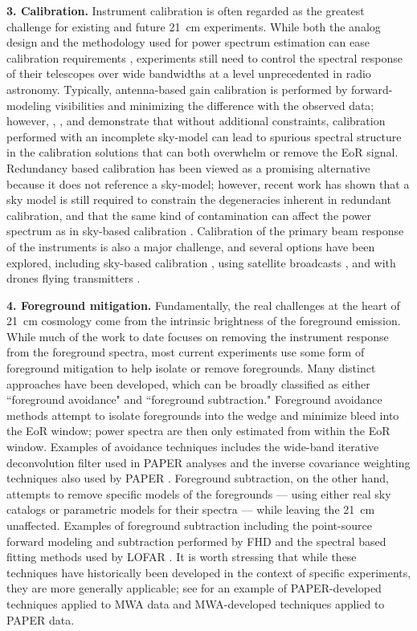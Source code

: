 \textbf{3. Calibration.} Instrument calibration is often regarded as the greatest challenge for existing and future 21~cm experiments.  While both the analog design and the methodology used for power spectrum estimation can ease calibration requirements \cite{morales19}, experiments still need to control the spectral response of their telescopes over wide bandwidths at a level unprecedented in radio astronomy.  Typically, antenna-based gain calibration is performed by forward-modeling visibilities and minimizing the difference with the observed data; however, \cite{barry16}, \cite{patil16}, and \cite{trottwayth2016} demonstrate that without additional constraints, calibration performed with an incomplete sky-model can lead to spurious spectral structure in the calibration solutions that can both overwhelm or remove the EoR signal.  Redundancy based calibration has been viewed as a promising alternative because it does not reference a sky-model; however, recent work has shown that a sky model is still required to constrain the degeneracies inherent in redundant calibration, and that the same kind of contamination can affect the power spectrum as in sky-based calibration \cite{byrne19,li18_redundant,joseph18}. Calibration of the primary beam response of the instruments is also a major challenge, and several options have been explored, including sky-based calibration \cite{pober12}, using satellite broadcasts \cite{neben15,neben16,line18}, and with drones flying transmitters \cite{jacobs17}.

\textbf{4. Foreground mitigation.} Fundamentally, the real challenges at the heart of 21~cm cosmology come from the intrinsic brightness of the foreground emission.  While much of the work to date focuses on removing the instrument response from the foreground spectra, most current experiments use some form of foreground mitigation to help isolate or remove foregrounds.  Many distinct approaches have been developed, which can be broadly classified as either ``foreground avoidance" and ``foreground subtraction."  Foreground avoidance methods attempt to isolate foregrounds into the wedge and minimize bleed into the EoR window; power spectra are then only estimated from within the EoR window.  Examples of avoidance techniques includes the wide-band iterative deconvolution filter used in PAPER analyses \cite{kerrigan18} and the inverse covariance weighting techniques also used by PAPER \cite{cheng18}.  Foreground subtraction, on the other hand, attempts to remove specific models of the foregrounds --- using either real sky catalogs or parametric models for their spectra --- while leaving the 21~cm unaffected.  Examples of foreground subtraction including the point-source forward modeling and subtraction performed by FHD \cite{barry19} and the spectral based fitting methods used by LOFAR \cite{chapman14,2018MNRAS.478.3640M}.  It is worth stressing that while these techniques have historically been developed in the context of specific experiments, they are more generally applicable; see \cite{kerrigan18}
for an example of PAPER-developed techniques applied to MWA data and MWA-developed techniques applied to PAPER data.

